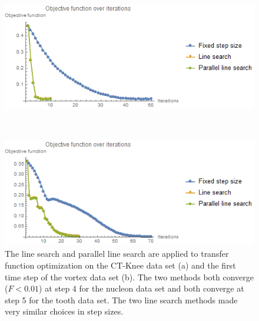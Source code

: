 \begin{figure}
	\centering
	\begin{minipage}{.49\textwidth}
		\includegraphics[width=1\linewidth]{images/CT-Knee_naive_rms_fixed_linesearch_parallel}
		\subcaption{}
	\end{minipage}~
	\begin{minipage}{.49\textwidth}
		\includegraphics[width=1\linewidth]{images/vortex_naive_rms_fixed_linesearch_parallel}
		\subcaption{}
	\end{minipage}
	\caption{The line search and parallel line search are applied to transfer function optimization on the CT-Knee data set (a) and the first time step of the vortex data set (b). The two methods both converge ($F<0.01$) at step 4 for the nucleon data set and both converge at step 5 for the tooth data set. The two line search methods made very similar choices in step sizes.}
	\label{fig:CT-Knee_naive_vortex_naive_rms_linesearch}
\end{figure}

